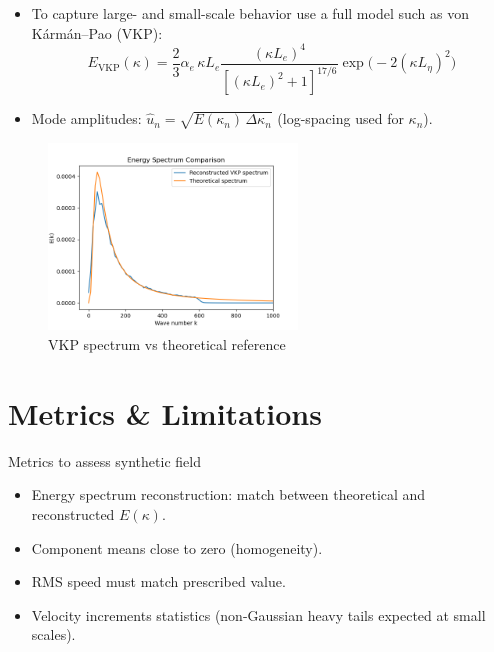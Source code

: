 \documentclass[11pt]{beamer}
\begin{document}
\begin{frame}
  \begin{itemize}
  \item To capture large- and small-scale behavior use a full model such as von K\'arm\'an–Pao (VKP):
      \begin{equation}
        E_{\mathrm{VKP}}(\kappa)=\frac{2}{3}\alpha_e\,\kappa L_e\frac{(\kappa L_e)^4}{[(\kappa L_e)^2+1]^{17/6}}\exp\big(-2(\kappa L_\eta)^2\big)
      \end{equation}
    \item Mode amplitudes: $\hat{u}_n=\sqrt{E(\kappa_n)\,\Delta\kappa_n}$ (log-spacing used for $\kappa_n$).
  \end{itemize}
  \begin{figure}
    \centering
    \includegraphics[width=0.59\textwidth]{illustrations/Energy_Spectrum_VKP.png}
    \caption{VKP spectrum vs theoretical reference}
  \end{figure}
\end{frame}

\section{Metrics \& Limitations}
\begin{frame}{Metrics to assess synthetic field}
  \begin{itemize}
    \item Energy spectrum reconstruction: match between theoretical and reconstructed $E(\kappa)$.
    \item Component means close to zero (homogeneity).
    \item RMS speed must match prescribed value.
    \item Velocity increments statistics (non-Gaussian heavy tails expected at small scales).
  \end{itemize}
\end{frame}
\end{document}
